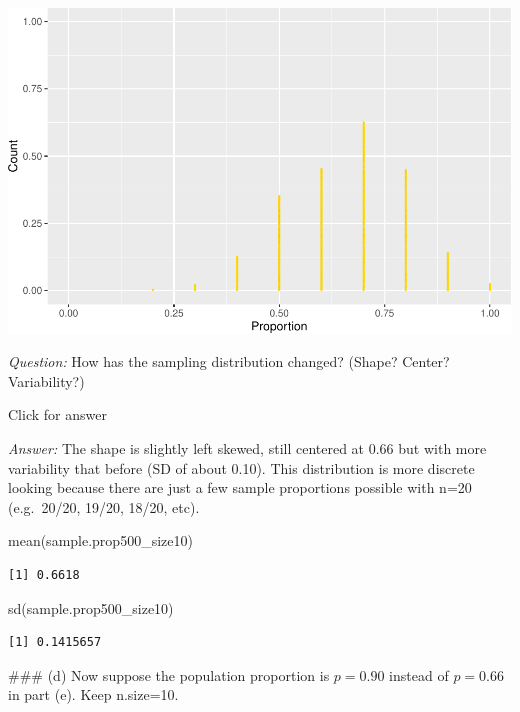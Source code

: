 \documentclass[
]{book}
\newenvironment{Shaded}{\begin{snugshade}}{\end{snugshade}}
\newcommand{\FunctionTok}[1]{\textcolor[rgb]{0.00,0.00,0.00}{#1}}
\newcommand{\NormalTok}[1]{#1}
\begin{document}
\includegraphics[width=1\linewidth]{Class_Activity_7_files/figure-latex/unnamed-chunk-15-1}

\emph{Question:} How has the sampling distribution changed? (Shape? Center? Variability?)

Click for answer

\emph{Answer:} The shape is slightly left skewed, still centered at 0.66 but with more variability that before (SD of about 0.10). This distribution is more discrete looking because there are just a few sample proportions possible with n=20 (e.g.~20/20, 19/20, 18/20, etc).

\begin{Shaded}
\begin{Highlighting}[]
\FunctionTok{mean}\NormalTok{(sample.prop500\_size10)}
\end{Highlighting}
\end{Shaded}

\begin{verbatim}
[1] 0.6618
\end{verbatim}

\begin{Shaded}
\begin{Highlighting}[]
\FunctionTok{sd}\NormalTok{(sample.prop500\_size10)}
\end{Highlighting}
\end{Shaded}

\begin{verbatim}
[1] 0.1415657
\end{verbatim}

\#\#\# (d) Now suppose the population proportion is \(p=0.90\) instead of \(p=0.66\) in part (e). Keep n.size=10.
\end{document}
